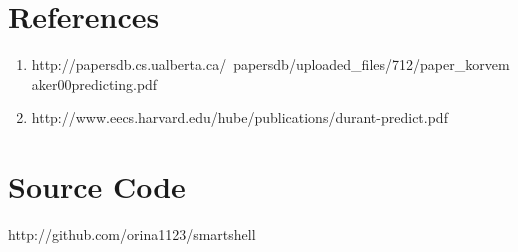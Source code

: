 \documentclass[11pt,a4paper]{article}
\begin{document}
\section*{References}
\begin{enumerate}
\item http://papersdb.cs.ualberta.ca/~papersdb/uploaded\_files/712/paper\_korvemaker00predicting.pdf
\item http://www.eecs.harvard.edu/hube/publications/durant-predict.pdf
\end{enumerate}

\section*{Source Code}
http://github.com/orina1123/smartshell




\end{document}
